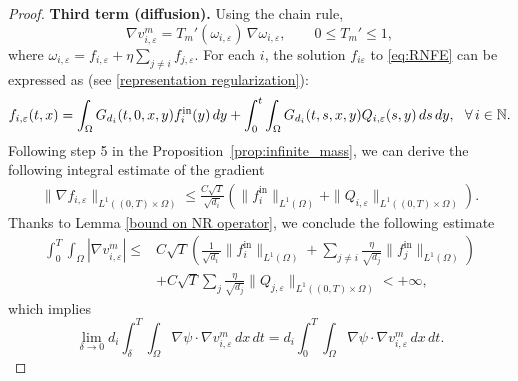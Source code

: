 \documentclass[a4paper,12pt,reqno]{amsart}
\theoremstyle{plain}
\numberwithin{equation}{section}
\begin{document}
\begin{proof}
		\medskip
		\noindent\textbf{Third term (diffusion).}
		Using the chain rule,
		\[
		\nabla v^m_{i,\varepsilon}
		=
		T_m'(\omega_{i,\varepsilon})\,\nabla\omega_{i,\varepsilon},
		\qquad
		0 \le T_m' \le 1,
		\]
		where
		\(
		\omega_{i,\varepsilon}
		=
		f_{i,\varepsilon}
		+ \eta \sum_{j\ne i} f_{j,\varepsilon}.
		\) For each $i$, the solution $f_{i\varepsilon}$ to \eqref{eq:RNFE} can be expressed as (see \eqref{representation regularization}):
		\[
		f_{i,\varepsilon}(t,x)= \int_{\Omega}G_{d_i}(t,0,x,y)f_i^{\rm{in}}(y)\, dy+\int_{0}^{t}\int_{\Omega} G_{d
			_i}(t,s,x,y)Q_{i,\varepsilon}(s,y) \, ds\, dy, \ \ \forall \, i\in\mathbb{N}.
		\]
		Following step 5 in the Proposition~\eqref{prop:infinite_mass}, we can derive the following integral estimate of the gradient
		\begin{align}\label{gradient estimate:regularization}
			\|\nabla f_{i,\varepsilon}\|_{L^1((0,T)\times\Omega)}
			\le
			\frac{C\sqrt{T}}{\sqrt{d_i}}
			\left(
			\|f_i^{\mathrm{in}}\|_{L^1(\Omega)}
			+
			\|Q_{i,\varepsilon}\|_{L^1((0,T)\times\Omega)}
			\right).
		\end{align}
		Thanks to Lemma \ref{bound on NR operator}, we conclude the following estimate
		\begin{align*}
			\int_0^T\!\!\int_\Omega
			|\nabla v^m_{i,\varepsilon}|
			\le &
			C\sqrt{T}
			\left(
			\frac{1}{\sqrt{d_i}}\|f_i^{\mathrm{in}}\|_{L^1(\Omega)}
			+
			\sum_{j\ne i}\frac{\eta}{\sqrt{d_j}}\|f_j^{\mathrm{in}}\|_{L^1(\Omega)}\right)\\
			&
			+
			C\sqrt{T}\sum_{j}\frac{\eta}{\sqrt{d_j}}\|Q_{j,\varepsilon}\|_{L^1((0,T)\times\Omega)}<+\infty,
		\end{align*}
		which implies
		\[
		\lim_{\delta\to0}
		d_i\int_{\delta}^{T}\!\!\int_\Omega
		\nabla\psi\cdot\nabla v^m_{i,\varepsilon}\,dx\,dt
		=
		d_i\int_{0}^{T}\!\!\int_\Omega
		\nabla\psi\cdot\nabla v^m_{i,\varepsilon}\,dx\,dt .
		\]
		

\end{proof}
\end{document}
